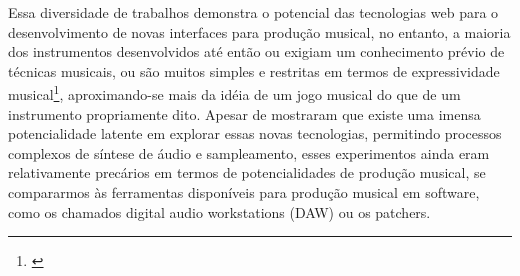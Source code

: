 Essa diversidade de trabalhos demonstra o potencial das tecnologias web para o desenvolvimento de novas interfaces para produção musical, no entanto, a maioria dos instrumentos desenvolvidos até então ou exigiam um conhecimento prévio de técnicas musicais, ou são muitos simples e restritas em termos de expressividade musical\footnote{\cite{Dobrian2006}}, aproximando-se mais da idéia de um jogo musical do que de um instrumento propriamente dito. Apesar de mostraram que existe uma imensa potencialidade latente em explorar essas novas tecnologias, permitindo processos complexos de síntese de áudio e sampleamento, esses experimentos ainda eram relativamente precários em termos de potencialidades de produção musical, se compararmos às ferramentas disponíveis para produção musical em software, como os chamados digital audio workstations (DAW) ou os patchers.